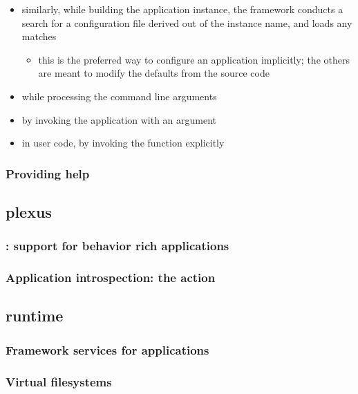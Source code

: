 \begin{frame}
\begin{itemize}
\begin{itemize}
    \end{itemize}
%
  \item similarly, while building the application instance, the framework conducts a search for
    a configuration file derived out of the instance name, and loads any matches
    \begin{itemize}
    \item this is the preferred way to configure an application implicitly; the others are
      meant to modify the defaults from the source code
    \end{itemize}
%
  \item while processing the command line arguments
%
  \item by invoking the application with an  argument
%
  \item in user code, by invoking the function  explicitly
%
  \end{itemize}
%
\end{frame}

\begin{frame}
%
  \frametitle{Providing help}
%
\end{frame}

\subsection{plexus}
\begin{frame}
%
  \frametitle{: support for behavior rich applications}
%
\end{frame}

\begin{frame}
%
  \frametitle{Application introspection: the action }
%
\end{frame}

\subsection{runtime}
\begin{frame}
%
  \frametitle{Framework services for applications}
%
\end{frame}

\begin{frame}
%
  \frametitle{Virtual filesystems}
%
\end{frame}


